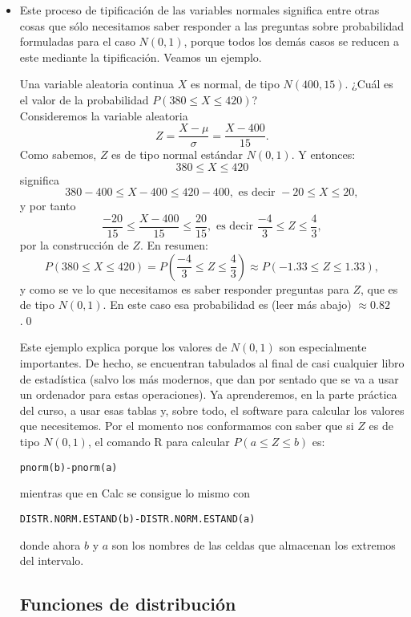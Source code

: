 \begin{itemize}
       \item Este proceso de tipificación de las variables normales significa entre otras cosas que sólo necesitamos saber responder a las preguntas sobre probabilidad formuladas para el caso $N(0,1)$, porque todos los demás casos se reducen a este mediante la tipificación. Veamos un ejemplo.
           \begin{ejemplo}
           Una variable aleatoria continua $X$ es normal, de tipo $N(400,15)$. ¿Cuál es el valor de la probabilidad $P(380\leq X\leq 420)$?\\
           Consideremos la variable aleatoria
           \[Z=\dfrac{X-\mu}{\sigma}=\dfrac{X-400}{15}.\]
           Como sabemos, $Z$ es de tipo normal estándar $N(0,1)$. Y entonces:
           \[380\leq X\leq 420\]
           significa
           \[380-400\leq X-400\leq 420-400,\mbox{ es decir }-20\leq X\leq 20,\]
           y por tanto
           \[\dfrac{-20}{15}\leq \dfrac{X-400}{15}\leq\dfrac{20}{15},\mbox{ es decir }\dfrac{-4}{3}\leq Z\leq\dfrac{4}{3},\]
           por la construcción de $Z$. En resumen:
           \[P(380\leq X\leq 420)=P\left(\dfrac{-4}{3}\leq Z\leq\dfrac{4}{3}\right)\approx P(-1.33\leq Z\leq 1.33),\]
           y como se ve lo que necesitamos es saber responder preguntas para $Z$, que es de tipo $N(0,1)$. En este caso esa probabilidad es (leer más abajo) $\approx 0.82$.\qed
           \end{ejemplo}
       Este ejemplo explica porque los valores de $N(0,1)$ son especialmente importantes. De hecho, se encuentran tabulados al final de casi cualquier libro de estadística (salvo los más modernos, que dan por sentado que se va a usar un ordenador para estas operaciones). Ya aprenderemos, en la parte práctica del curso, a usar esas tablas y, sobre todo, el software para calcular los valores que necesitemos. Por el momento nos conformamos con saber que si $Z$ es de tipo $N(0,1)$, el comando R para calcular $P(a\leq Z\leq b)$ es:\\
       \begin{center}
       {\tt pnorm(b)-pnorm(a)}
       \end{center}
       mientras que en Calc se consigue lo mismo con
       \begin{center}
       {\tt DISTR.NORM.ESTAND(b)-DISTR.NORM.ESTAND(a)}
       \end{center}
       donde ahora $b$ y $a$ son los nombres de las celdas que almacenan los extremos del intervalo.
       \subsection*{Funciones de distribución}


\end{itemize}
